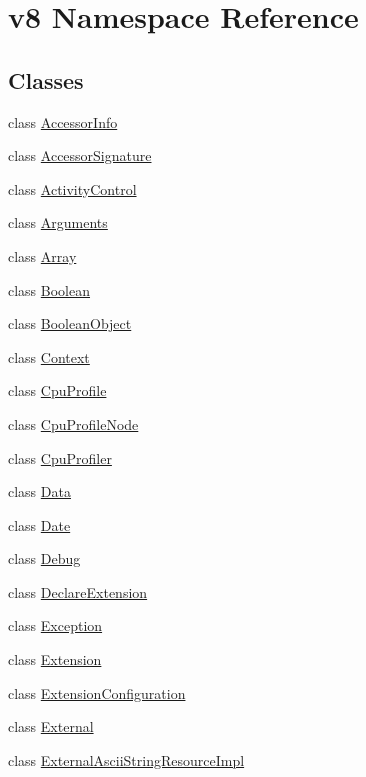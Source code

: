 \hypertarget{namespacev8}{}\section{v8 Namespace Reference}
\label{namespacev8}
\subsection*{Classes}
\begin{DoxyCompactItemize}
\item 
class \hyperlink{classv8_1_1_accessor_info}{Accessor\+Info}
\item 
class \hyperlink{classv8_1_1_accessor_signature}{Accessor\+Signature}
\item 
class \hyperlink{classv8_1_1_activity_control}{Activity\+Control}
\item 
class \hyperlink{classv8_1_1_arguments}{Arguments}
\item 
class \hyperlink{classv8_1_1_array}{Array}
\item 
class \hyperlink{classv8_1_1_boolean}{Boolean}
\item 
class \hyperlink{classv8_1_1_boolean_object}{Boolean\+Object}
\item 
class \hyperlink{classv8_1_1_context}{Context}
\item 
class \hyperlink{classv8_1_1_cpu_profile}{Cpu\+Profile}
\item 
class \hyperlink{classv8_1_1_cpu_profile_node}{Cpu\+Profile\+Node}
\item 
class \hyperlink{classv8_1_1_cpu_profiler}{Cpu\+Profiler}
\item 
class \hyperlink{classv8_1_1_data}{Data}
\item 
class \hyperlink{classv8_1_1_date}{Date}
\item 
class \hyperlink{classv8_1_1_debug}{Debug}
\item 
class \hyperlink{classv8_1_1_declare_extension}{Declare\+Extension}
\item 
class \hyperlink{classv8_1_1_exception}{Exception}
\item 
class \hyperlink{classv8_1_1_extension}{Extension}
\item 
class \hyperlink{classv8_1_1_extension_configuration}{Extension\+Configuration}
\item 
class \hyperlink{classv8_1_1_external}{External}
\item 
class \hyperlink{classv8_1_1_external_ascii_string_resource_impl}{External\+Ascii\+String\+Resource\+Impl}

\end{DoxyCompactItemize}
